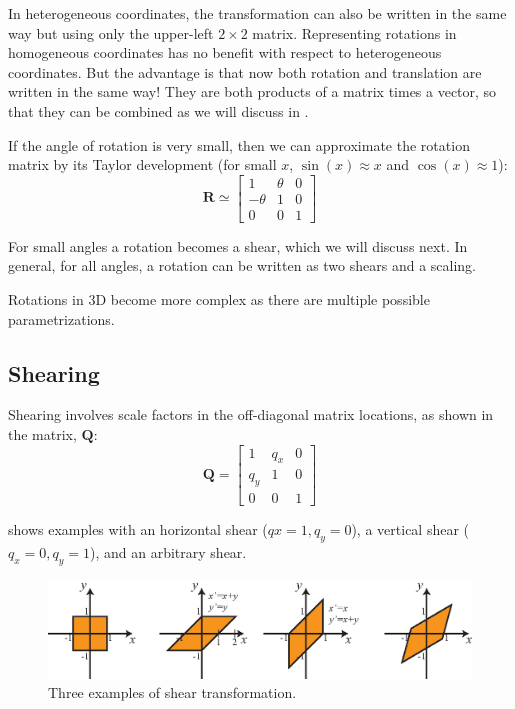 In heterogeneous coordinates, the transformation can also be written in the same way but using only the upper-left $2\times2$ matrix. Representing rotations in homogeneous coordinates has no benefit with respect to heterogeneous coordinates. But the advantage is that now both rotation and translation are written in the same way! They are both products of a matrix times a vector, so that they can be combined as we will discuss in \sect{\ref{sec:chaining_transformations}}.   


If the angle of rotation is very small, then we can approximate the rotation matrix by its Taylor development
(for small $x$, $\sin(x) \approx x$ and $\cos(x) \approx 1$):
\begin{equation}
    \mathbf{R} \simeq            
    \begin{bmatrix}
    1 & \theta & 0 \\
    -\theta & 1 & 0 \\
    0 & 0 & 1
    \end{bmatrix}
\end{equation}

For small angles a rotation becomes a shear, which we will discuss next. In general, for all angles, a rotation can be written as two shears and a scaling.

Rotations in 3D become more complex as there are multiple possible parametrizations. 


\subsection{Shearing}

Shearing involves scale factors in the off-diagonal matrix locations, as shown in the matrix, $\mathbf{Q}$:
\begin{equation}
    \mathbf{Q} =             
    \begin{bmatrix}
    1 & q_x & 0 \\
    q_y & 1 & 0 \\
    0 & 0 & 1
    \end{bmatrix}
\end{equation}

\Fig{\ref{fig:shear}} shows examples with an horizontal shear ($qx=1, q_y=0$), a vertical shear ($q_x=0, q_y=1$), and an arbitrary shear. 

\begin{figure}
\centerline{
\includegraphics[width=1\linewidth]{figures/imaging_geometry/shear.eps}
}
\caption{Three examples of shear transformation.}
\label{fig:shear}
\end{figure}

